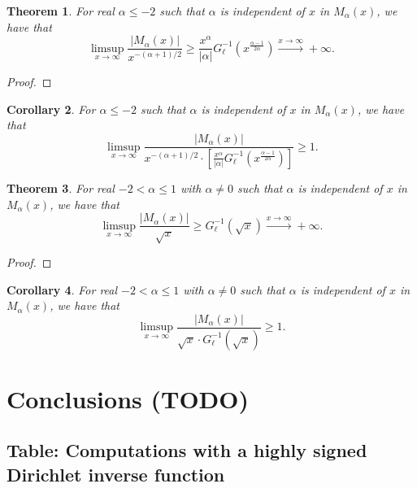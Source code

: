 \documentclass[11pt,reqno,a4letter]{article}
\numberwithin{figure}{section}
\numberwithin{table}{section}
\theoremstyle{plain}
\newtheorem{theorem}{Theorem}
\newtheorem{cor}[theorem]{Corollary}
\numberwithin{theorem}{section}
\theoremstyle{definition}
\begin{document}
\begin{theorem} 
For real $\alpha \leq -2$ such that $\alpha$ is independent of $x$ in $M_{\alpha}(x)$, 
we have that 
\[
\limsup\limits_{x \rightarrow \infty} \frac{|M_{\alpha}(x)|}{x^{-(\alpha+1)/2}} \geq 
     \frac{x^{\alpha}}{|\alpha|} G_{\ell}^{-1}\left(x^{\frac{\alpha-1}{2\alpha}}\right) 
     \xrightarrow{x \rightarrow \infty} +\infty. 
\]
\end{theorem}
\begin{proof} 
\end{proof} 

\begin{cor}
For $\alpha \leq -2$ such that $\alpha$ is independent of $x$ in $M_{\alpha}(x)$, 
we have that 
\[
\limsup\limits_{x \rightarrow \infty} 
     \frac{|M_{\alpha}(x)|}{x^{-(\alpha+1)/2} \cdot \left[\frac{x^{\alpha}}{|\alpha|} 
     G_{\ell}^{-1}\left(x^{\frac{\alpha-1}{2\alpha}}\right)\right]} \geq 1. 
\]
\end{cor} 

\begin{theorem} 
For real $-2 < \alpha \leq 1$ with $\alpha \neq 0$ 
such that $\alpha$ is independent of $x$ in $M_{\alpha}(x)$, we have that 
\[
\limsup\limits_{x \rightarrow \infty} \frac{|M_{\alpha}(x)|}{\sqrt{x}} \geq 
     G_{\ell}^{-1}\left(\sqrt{x}\right) 
     \xrightarrow{x \rightarrow \infty} +\infty. 
\]
\end{theorem}
\begin{proof} 
\end{proof} 

\begin{cor} 
For real $-2 < \alpha \leq 1$ with $\alpha \neq 0$ 
such that $\alpha$ is independent of $x$ in $M_{\alpha}(x)$, we have that 
\[
\limsup\limits_{x \rightarrow \infty} \frac{|M_{\alpha}(x)|}{\sqrt{x} 
     \cdot G_{\ell}^{-1}\left(\sqrt{x}\right)} \geq 1. 
\]
\end{cor}

\newpage 
\section{Conclusions (TODO)} 

\newpage 
\renewcommand{\refname}{References} 
{}


\newpage
\renewcommand{\thesubsection}{T.\arabic{subsection}}
\subsection{Table: Computations with a highly signed Dirichlet inverse function} 
\label{table_conjecture_Mertens_ginvSeq_approx_values}
\end{document}
